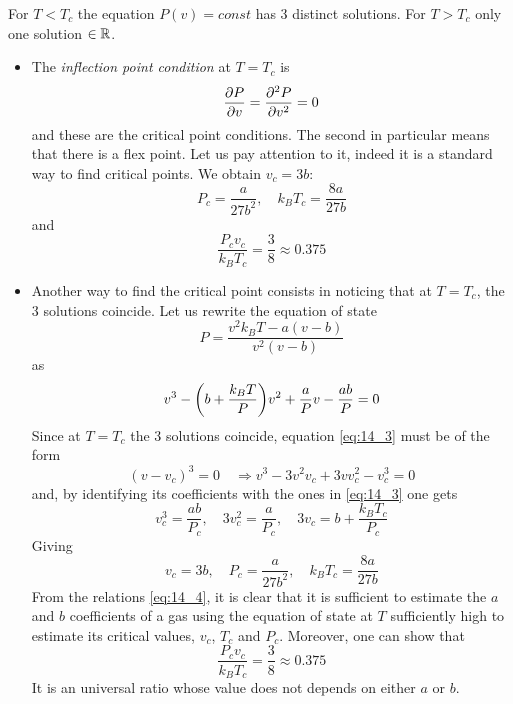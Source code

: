 \documentclass[../main/main.tex]{subfiles}
\begin{document}
For \( T < T_c \) the equation \( P(v) = const \) has 3 distinct solutions. For \( T > T_c \) only one solution \( \in \mathbb{R} \).

\begin{itemize}
\item
The \emph{inflection point condition} at \( T = T_c \) is
\begin{equation}
  \pdv{P}{v} = \pdv[2]{P}{v} = 0
\end{equation}
and these are the critical point conditions. The second in particular means that there is a flex point. Let us pay attention to it, indeed it is a standard way to find critical points.
We obtain  \( v_c = 3 b \):
\begin{equation}
  P_c = \frac{a}{27 b^2}, \quad k_B T_c = \frac{8a}{27b}
\end{equation}
and
\begin{equation}
  \frac{P_c v_c}{k_B T_c} = \frac{3}{8}  \approx 0.375
\end{equation}

\item Another way to find the critical point consists in noticing that at \( T=T_c \), the 3 solutions coincide.
Let us rewrite the equation of state
\begin{equation}
  P = \frac{v^2 k_B T - a (v-b)}{v^2 (v-b)}
\end{equation}
as
\begin{equation}
  v^3 - \qty(b + \frac{k_B T}{P})v^2 + \frac{a}{P} v - \frac{a b }{P} = 0
  \label{eq:14_3}
\end{equation}
Since at \( T=T_c \) the 3 solutions coincide, equation  \eqref{eq:14_3} must be of the form
\begin{equation}
  (v-v_c)^3 = 0 \quad \Rightarrow v^3 - 3 v^2 v_c + 3 v v_c^2 - v_c^3 = 0
\end{equation}
and, by identifying its coefficients with the ones in \eqref{eq:14_3} one gets
\begin{equation}
  v_c^3 = \frac{a b}{P_c}, \quad 3 v_c^2 = \frac{a}{P_c}, \quad 3 v_c = b + \frac{k_B T_c}{P_c}
\end{equation}
Giving
\begin{equation}
  v_c = 3 b, \quad P_c = \frac{a}{27 b^2}, \quad k_B T_c = \frac{8 a }{27 b }
  \label{eq:14_4}
\end{equation}
From the relations \eqref{eq:14_4}, it is clear that it is sufficient to estimate the \( a \) and \( b \) coefficients of a gas using the equation of state at \( T \) sufficiently high to estimate its critical values, \( v_c \), \( T_c \) and \( P_c \).
Moreover, one can show that
\begin{equation}
    \frac{P_c v_c}{k_B T_c} = \frac{3}{8}  \approx 0.375
\end{equation}
It is an universal ratio whose value does not depends on either \( a \) or \( b \).
\end{itemize}
\end{document}
